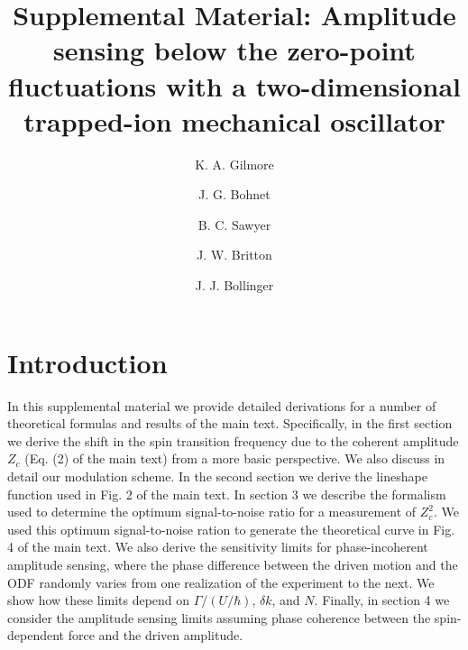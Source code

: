 \documentclass[aps,prl,onecolumn,superscriptaddress,floatfix]{revtex4-1}
\begin{document}
\title{Supplemental Material: Amplitude sensing below the zero-point fluctuations with a two-dimensional trapped-ion mechanical oscillator}
\author{K. A. Gilmore}


\author{J. G. Bohnet}

\author{B. C. Sawyer}

\author{J. W. Britton}

\author{J. J. Bollinger}
\maketitle

\section*{Introduction}
In this supplemental material we provide detailed derivations for a number of theoretical formulas and results of the main text. Specifically, in the first section we derive  the shift in the spin transition frequency due to the coherent amplitude $Z_c$ (Eq. (2) of the main text) from a more basic perspective. We also discuss in detail our modulation scheme. In the second section we derive the lineshape function used in Fig. 2 of the main text. In section 3 we describe the formalism used to determine the optimum signal-to-noise ratio for a measurement of $Z_{c}^2$. We used this optimum signal-to-noise ration to generate the theoretical curve in Fig. 4 of the main text. We also derive the sensitivity limits for phase-incoherent amplitude sensing, where the phase difference between the driven motion and the ODF randomly varies from one realization of the experiment to the next. We show how these limits depend on $\Gamma/(U/\hbar)$, $\delta k$, and $N$. Finally, in section 4 we consider the amplitude sensing limits assuming phase coherence between the spin-dependent force and the driven amplitude. 
\end{document}
